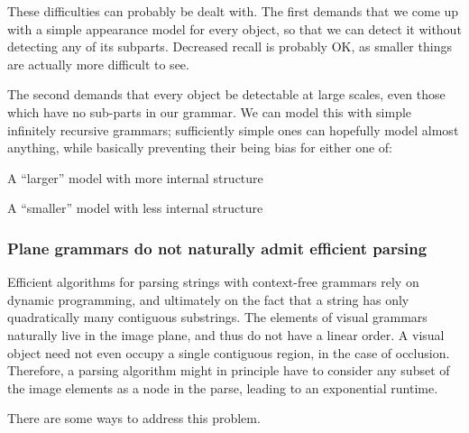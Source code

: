 \documentclass{article}
\newcommand\note[1]{}
\begin{document}
These difficulties can probably be dealt with. The first demands that
we come up with a simple appearance model for every object, so that we
can detect it without detecting any of its subparts. Decreased recall
is probably OK, as smaller things are actually more difficult to see.

The second demands that every object be detectable at large scales,
even those which have no sub-parts in our grammar. We can model this
with simple infinitely recursive grammars; sufficiently simple ones
can hopefully model almost anything, while basically preventing their
being bias for either one of: 
\bitem
\item A ``larger'' model with more internal structure
\item A ``smaller'' model with less internal structure
\eitem

\subsubsection{Plane grammars do not naturally admit efficient parsing}

Efficient algorithms for parsing strings with context-free grammars
rely on dynamic programming, and ultimately on the fact that a string
has only quadratically many contiguous substrings. The elements of
visual grammars naturally live in the image plane, and thus do not
have a linear order. A visual object need not even occupy a single
contiguous region, in the case of occlusion. Therefore, a parsing
algorithm might in principle have to consider any subset of the image
elements as a node in the parse, leading to an exponential runtime.

There are some ways to address this problem.


\end{document}
